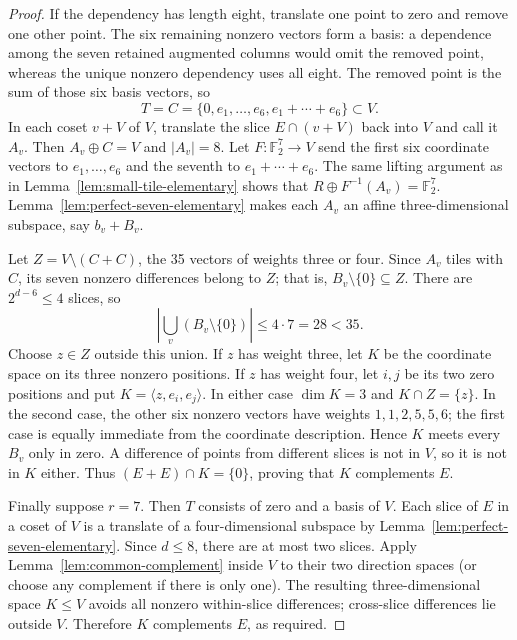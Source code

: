 \documentclass[11pt]{article}
\numberwithin{equation}{section}
\theoremstyle{definition}
\theoremstyle{remark}\newtheorem{remark}[theorem]{Remark}
\begin{document}
\begin{proof}
If the dependency has length eight, translate one point to zero and
remove one other point. The six remaining nonzero vectors form a basis:
a dependence among the seven retained augmented columns would omit the
removed point, whereas the unique nonzero dependency uses all eight.
The removed point is the sum of those six basis vectors, so
\[
 T=C=\{0,e_1,\ldots,e_6,e_1+\cdots+e_6\}\subset V.
\]
In each coset $v+V$ of $V$, translate the slice $E\cap(v+V)$ back into
$V$ and call it $A_v$.  Then $A_v\oplus C=V$ and $|A_v|=8$.
Let $F:\mathbb F_2^7\to V$ send the first six coordinate vectors to
$e_1,\ldots,e_6$ and the seventh to $e_1+\cdots+e_6$.
The same lifting argument as in
Lemma~\ref{lem:small-tile-elementary} shows that
$R\oplus F^{-1}(A_v)=\mathbb F_2^7$.
Lemma~\ref{lem:perfect-seven-elementary} makes each $A_v$ an affine
three-dimensional subspace, say $b_v+B_v$.

Let $Z=V\setminus(C+C)$, the 35 vectors of weights three or four.
Since $A_v$ tiles with $C$, its seven nonzero differences belong to $Z$;
that is, $B_v\setminus\{0\}\subseteq Z$.  There are
$2^{d-6}\le4$ slices, so
\[
 \left|\bigcup_v(B_v\setminus\{0\})\right|\le4\cdot7=28<35.
\]
Choose $z\in Z$ outside this union.  If $z$ has weight three, let $K$
be the coordinate space on its three nonzero positions.  If $z$ has
weight four, let $i,j$ be its two zero positions and put
$K=\langle z,e_i,e_j\rangle$.  In either case $\dim K=3$ and
$K\cap Z=\{z\}$.  In the second case, the other six nonzero vectors
have weights $1,1,2,5,5,6$; the first case is equally immediate from the
coordinate description.  Hence $K$ meets every $B_v$ only in zero.
A difference of points from different slices is not in $V$, so it is not
in $K$ either.  Thus $(E+E)\cap K=\{0\}$, proving that $K$ complements
$E$.

Finally suppose $r=7$.  Then $T$ consists of zero and a basis of $V$.
Each slice of $E$ in a coset of $V$ is a translate of a four-dimensional
subspace by Lemma~\ref{lem:perfect-seven-elementary}.  Since $d\le8$,
there are at most two slices.  Apply
Lemma~\ref{lem:common-complement} inside $V$ to their two direction
spaces (or choose any complement if there is only one).  The resulting
three-dimensional space $K\le V$ avoids all nonzero within-slice
differences; cross-slice differences lie outside $V$.  Therefore $K$
complements $E$, as required.
\end{proof}
\end{document}
